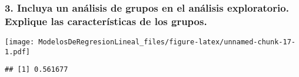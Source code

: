\documentclass[
]{article}
\newenvironment{Shaded}{\begin{snugshade}}{\end{snugshade}}
\newcommand{\CommentTok}[1]{\textcolor[rgb]{0.56,0.35,0.01}{\textit{#1}}}
\newcommand{\DecValTok}[1]{\textcolor[rgb]{0.00,0.00,0.81}{#1}}
\newcommand{\FunctionTok}[1]{\textcolor[rgb]{0.00,0.00,0.00}{#1}}
\newcommand{\NormalTok}[1]{#1}
\newcommand{\OtherTok}[1]{\textcolor[rgb]{0.56,0.35,0.01}{#1}}
\newcommand{\SpecialCharTok}[1]{\textcolor[rgb]{0.00,0.00,0.00}{#1}}
\begin{document}
\hypertarget{incluya-un-anuxe1lisis-de-grupos-en-el-anuxe1lisis-exploratorio.-explique-las-caracteruxedsticas-de-los-grupos.}{%
\subsubsection{3. Incluya un análisis de grupos en el análisis
exploratorio. Explique las características de los
grupos.}\label{incluya-un-anuxe1lisis-de-grupos-en-el-anuxe1lisis-exploratorio.-explique-las-caracteruxedsticas-de-los-grupos.}}

\begin{Shaded}
\end{Shaded}

\texttt{[image: ModelosDeRegresionLineal\_files/figure-latex/unnamed-chunk-17-1.pdf]}

\begin{Shaded}
\end{Shaded}

\begin{verbatim}
## [1] 0.561677
\end{verbatim}

\begin{Shaded}
\end{Shaded}
\end{document}
